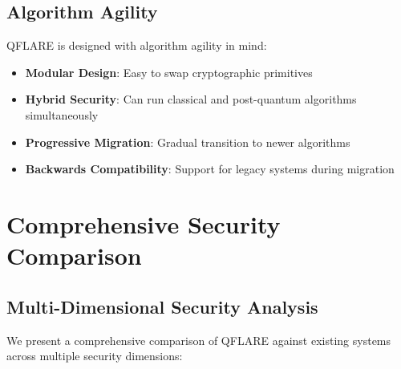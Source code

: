 \documentclass[journal,onecolumn]{IEEEtran}
\begin{document}
\subsection{Algorithm Agility}

QFLARE is designed with algorithm agility in mind:

\begin{itemize}
\item \textbf{Modular Design}: Easy to swap cryptographic primitives
\item \textbf{Hybrid Security}: Can run classical and post-quantum algorithms simultaneously
\item \textbf{Progressive Migration}: Gradual transition to newer algorithms
\item \textbf{Backwards Compatibility}: Support for legacy systems during migration
\end{itemize}

\section{Comprehensive Security Comparison}

\subsection{Multi-Dimensional Security Analysis}

We present a comprehensive comparison of QFLARE against existing systems across multiple security dimensions:
\end{document}

